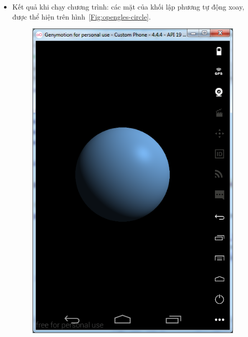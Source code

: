 \documentclass[13pt,a4paper]{extreport}
\begin{document}
	\newpage
	\begin{itemize}	
		\item Kết quả khi chạy chương trình: các mặt của khối lập phương tự động xoay, được thể hiện trên hình~\ref{Fig:opengles-circle}.
			\begin{figure}[!h]
				\begin{center}
					\includegraphics[scale=.6]{opengles-circle-1.png}
					\hspace{.5cm}

\end{center}
\end{figure}
\end{itemize}
\end{document}
